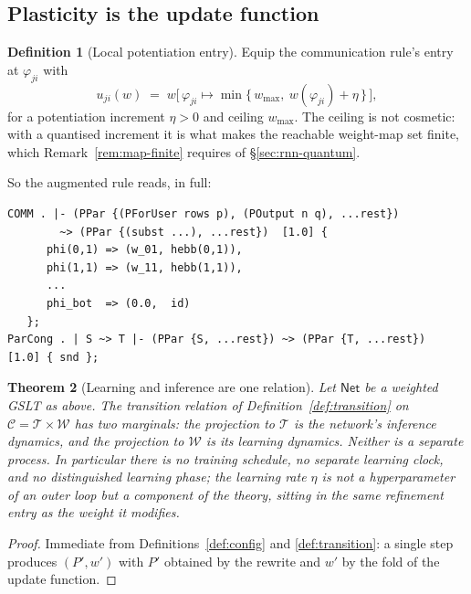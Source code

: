 \documentclass[11pt,a4paper]{article}
\theoremstyle{plain}
\newtheorem{theorem}{Theorem}
\theoremstyle{definition}
\newtheorem{definition}[theorem]{Definition}
\theoremstyle{remark}
\newcommand{\Terms}{\mathcal{T}}
\newcommand{\Cfg}{\mathcal{C}}
\newcommand{\Wt}{\mathcal{W}}
\newcommand{\wmap}{w}
\begin{document}
\subsection{Plasticity is the update function}
\label{sec:plasticity}

\begin{definition}[Local potentiation entry]
\label{def:hebb}
Equip the communication rule's entry at $\varphi_{ji}$ with
\[
u_{ji}(\wmap) \;=\; \wmap\big[\,\varphi_{ji} \mapsto \min\{\,w_{\max},\ \wmap(\varphi_{ji}) + \eta\,\}\,\big],
\]
for a potentiation increment $\eta > 0$ and ceiling $w_{\max}$. The ceiling is not cosmetic: with a
quantised increment it is what makes the reachable weight-map set finite, which
Remark~\ref{rem:map-finite} requires of \S\ref{sec:rnn-quantum}.
\end{definition}

So the augmented rule reads, in full:
\begin{center}
\begin{minipage}{0.92\textwidth}
\begin{lstlisting}
COMM . |- (PPar {(PForUser rows p), (POutput n q), ...rest})
        ~> (PPar {(subst ...), ...rest})  [1.0] {
      phi(0,1) => (w_01, hebb(0,1)),
      phi(1,1) => (w_11, hebb(1,1)),
      ...
      phi_bot  => (0.0,  id)
   };
ParCong . | S ~> T |- (PPar {S, ...rest}) ~> (PPar {T, ...rest})  [1.0] { snd };
\end{lstlisting}
\end{minipage}
\end{center}

\begin{theorem}[Learning and inference are one relation]
\label{thm:one-relation}
Let $\mathsf{Net}$ be a weighted GSLT as above. The transition relation of
Definition~\ref{def:transition} on $\Cfg = \Terms \times \Wt$ has two marginals: the projection to
$\Terms$ is the network's inference dynamics, and the projection to $\Wt$ is its learning dynamics.
Neither is a separate process. In particular there is no training schedule, no separate learning
clock, and no distinguished learning phase; the learning rate $\eta$ is not a hyperparameter of an
outer loop but a component of the theory, sitting in the same refinement entry as the weight it
modifies.
\end{theorem}

\begin{proof}
Immediate from Definitions~\ref{def:config} and \ref{def:transition}: a single step produces
$(P', \wmap')$ with $P'$ obtained by the rewrite and $\wmap'$ by the fold of the update function.
\end{proof}
\end{document}

